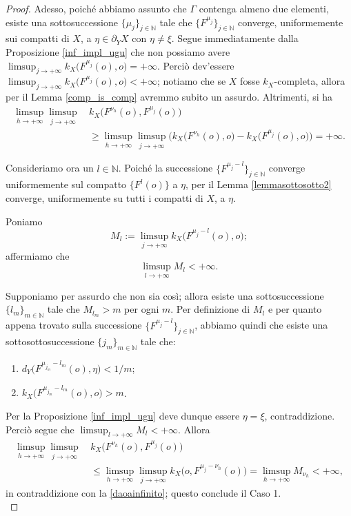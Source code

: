 \begin{proof}
    Adesso, poiché abbiamo assunto che $\Gamma$ contenga almeno due elementi, esiste una sottosuccessione $\{\mu_j\}_{j\in\mathbb{N}}$ tale che $\{F^{\mu_j}\}_{j\in\mathbb{N}}$ converge, uniformemente sui compatti di $X$, a $\eta\in\partial_YX$ con $\eta\not=\xi$. Segue immediatamente dalla Proposizione \ref{inf_impl_ugu} che non possiamo avere $\displaystyle\limsup_{j\longrightarrow+\infty} k_X\big(F^{\mu_j}(o),o\big)=+\infty$. Perciò dev'essere $\displaystyle\limsup_{j\longrightarrow+\infty} k_X\big(F^{\mu_j}(o),o\big)<+\infty$; notiamo che se $X$ fosse $k_X$-completa, allora per il Lemma \ref{comp_is_comp} avremmo subito un assurdo. Altrimenti, si ha
    \begin{equation} \label{daoainfinito}
        \begin{aligned}
            \limsup_{h\longrightarrow+\infty}\limsup_{j\longrightarrow+\infty}\, &k_X\big(F^{\nu_h}(o),F^{\mu_j}(o)\big) \\
            &\ge \limsup_{h\longrightarrow+\infty}\limsup_{j\longrightarrow+\infty} \Big(k_X\big(F^{\nu_h}(o),o\big)-k_X\big(F^{\mu_j}(o),o\big)\Big)=+\infty.
        \end{aligned}
    \end{equation}

    Consideriamo ora un $l\in\mathbb{N}$. Poiché la successione $\{F^{\mu_j-l}\}_{j\in\mathbb{N}}$ converge uniformemente sul compatto $\{F^l(o)\}$ a $\eta$, per il Lemma \ref{lemmasottosotto2} converge, uniformemente su tutti i compatti di $X$, a $\eta$.

    Poniamo
    $$M_l:=\limsup_{j\longrightarrow+\infty}k_X\big(F^{\mu_j-l}(o),o\big);$$
    affermiamo che
    $$\limsup_{l\longrightarrow+\infty}M_l<+\infty.$$

    Supponiamo per assurdo che non sia così; allora esiste una sottosuccessione $\{l_m\}_{m\in\mathbb{N}}$ tale che $M_{l_m}>m$ per ogni $m$. Per definizione di $M_l$ e per quanto appena trovato sulla successione $\{F^{\mu_j-l}\}_{j\in\mathbb{N}}$, abbiamo quindi che esiste una sottosottosuccessione $\{j_m\}_{m\in\mathbb{N}}$ tale che:
    \begin{enumerate}[label={(\arabic*)}]
        \item $d_Y\big(F^{\mu_{j_m}-l_m}(o),\eta\big)<1/m$;
        \item $k_X\big(F^{\mu_{j_m}-l_m}(o),o\big)>m$.
    \end{enumerate}

    Per la Proposizione \ref{inf_impl_ugu} deve dunque essere $\eta=\xi$, contraddizione. Perciò segue che $\displaystyle\limsup_{l\longrightarrow+\infty}M_l<+\infty$. Allora
    \begin{align*}
        \limsup_{h\longrightarrow+\infty}\limsup_{j\longrightarrow+\infty}\, &k_X\big(F^{\nu_h}(o),F^{\mu_j}(o)\big) \\
        &\le \limsup_{h\longrightarrow+\infty}\limsup_{j\longrightarrow+\infty} k_X\big(o,F^{\mu_j-\nu_h}(o)\big)=\limsup_{h\longrightarrow+\infty}M_{\nu_h}<+\infty,
    \end{align*}
    in contraddizione con la \eqref{daoainfinito}; questo conclude il Caso 1.\\


\end{proof}
